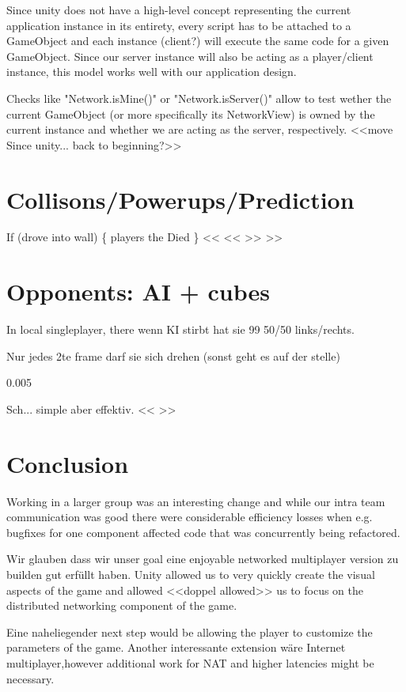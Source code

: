 \documentclass{report}
\begin{document}
Since unity does not have a high-level concept representing the current application instance in its entirety, every script has to be attached to a GameObject and each instance (client?) will execute the same code for a given GameObject. 
Since our server instance will also be acting as a player/client instance, this model works well with our application design.

Checks like "Network.isMine()" or "Network.isServer()" allow to test wether the current GameObject (or more specifically its NetworkView) is owned by the current instance and whether we are acting as the server, respectively. 
<<move Since unity... back to beginning?>>

\section{Collisons/Powerups/Prediction}
If (drove into wall) \{
	players the Died 
	\}
	<< << >> >>

\section{ Opponents: AI + cubes}
In local singleplayer, there 
wenn KI stirbt hat sie 99%
50/50 links/rechts.

Nur jedes 2te frame darf sie sich drehen (sonst geht es auf der stelle)

0.005%

Sch... simple aber effektiv.
<< >>


\section{Conclusion}
 Working in a larger group was an interesting change and while our intra team communication was good there were considerable efficiency losses when e.g. bugfixes for one component affected code that was concurrently being refactored.

 Wir glauben dass wir unser goal eine enjoyable networked multiplayer version zu builden gut erfüllt haben. Unity allowed us to very quickly create the visual aspects of the game and allowed <<doppel allowed>> us to focus on the distributed networking component of the game.

Eine naheliegender next step would be allowing the  player to customize the parameters of the game. Another interessante extension wäre Internet multiplayer,however additional work for NAT and higher latencies might be necessary.
\balancecolumns %


\end{document}
